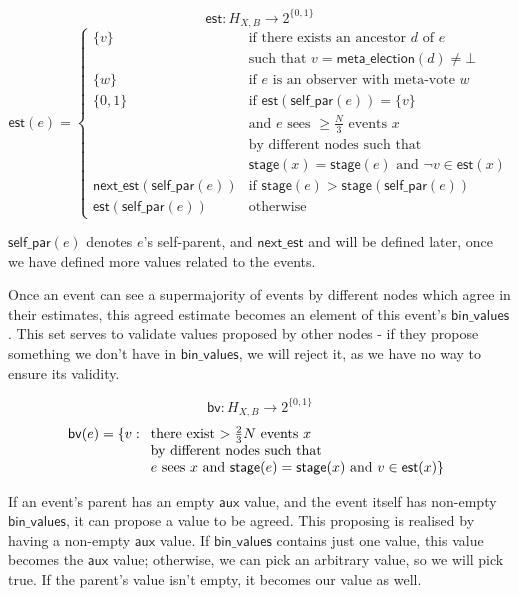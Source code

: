 \documentclass[a4paper,fleqn]{article}
\begin{document}
\[ \mathsf{est}: H_{X,B} \to 2^{\{0,1\}} \]
\[ \mathsf{est}(e) = \left\{ \begin{array}{ll}
	\{ v \} & \textrm{if there exists an ancestor $d$ of $e$} \\
	& \textrm{such that $v = \mathsf{meta\_election}(d) \neq \bot$} \\
	\{ w \} & \textrm{if $e$ is an observer with meta-vote $w$} \\
	\{ 0,1 \} & \textrm{if $\mathsf{est}(\mathsf{self\_par}(e)) = \{v\}$} \\
	& \textrm{and $e$ sees $\geq\frac{N}{3}$ events $x$}\\
	& \textrm{by different nodes such that} \\
	& \textrm{$\mathsf{stage}(x) = \mathsf{stage}(e)$ and $\neg v \in \mathsf{est}(x)$} \\
	\mathsf{next\_est}(\mathsf{self\_par}(e)) & \textrm{if $\mathsf{stage}(e) > 
		\mathsf{stage}(\mathsf{self\_par}(e))$} \\
	\mathsf{est}(\mathsf{self\_par}(e)) & \textrm{otherwise}
\end{array} \right. \]

$\mathsf{self\_par}(e)$ denotes $e$'s self-parent, and $\mathsf{next\_est}$ and will be defined
later, once we have defined more values related to the events.

Once an event can see a supermajority of events by different nodes which agree in their estimates,
this agreed estimate becomes an element of this event's $\mathsf{bin\_values}$. This set serves to
validate values proposed by other nodes - if they propose something we don't have in
$\mathsf{bin\_values}$, we will reject it, as we have no way to ensure its validity.

\[ \mathsf{bv}: H_{X,B} \to 2^{\{0,1\}} \]
\[ \mathsf{bv}(e)  =  \{ v: \begin{array}[t]{l} \textrm{there exist $> \frac{2}{3}N$ events $x$} \\
	\textrm{by different nodes such that} \\
	\textrm{$e$ sees $x$ and $\mathsf{stage}(e) = \mathsf{stage}(x)$ and $v \in \mathsf{est}(x)$}\}
\end{array}\]

If an event's parent has an empty $\mathsf{aux}$ value, and the event itself has non-empty
$\mathsf{bin\_values}$, it can propose a value to be agreed. This proposing is realised by having a
non-empty $\mathsf{aux}$ value. If $\mathsf{bin\_values}$ contains just one value, this value
becomes the $\mathsf{aux}$ value; otherwise, we can pick an arbitrary value, so we will pick true.
If the parent's value isn't empty, it becomes our value as well.
\end{document}
